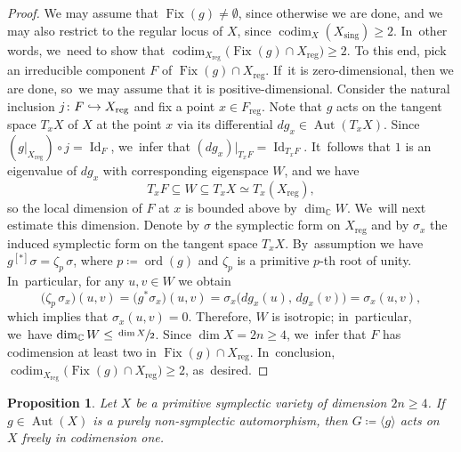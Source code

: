 \documentclass[JEP,XML,SOM,Unicode,published]{cedram}
\newcommand\hto{\mathrel{\lhook\joinrel\to}}
\theoremstyle{plain}
\newtheorem{prop}[thm]{Proposition}
\theoremstyle{definition}
\newcommand{\C}{\mathbb{C}}
\DeclareMathOperator{\codim}{codim}
\DeclareMathOperator{\Id}{Id}
\DeclareMathOperator{\Aut}{Aut}
\DeclareMathOperator{\Fix}{Fix}
\DeclareMathOperator{\ord}{ord}
\begin{document}
\begin{proof}
We may assume that $\Fix(g) \neq \emptyset$, since otherwise we are done, and we may also restrict to the regular locus of $X$, since $\codim_X (X_\text{sing}) \geq 2$. In~other words, we~need to show that $\codim_{X_\text{reg}} \bigl(\Fix(g) \cap X_{\text{reg}} \bigr) \geq 2$.
To this end, pick an irreducible component $F$ of $\Fix(g) \cap X_{\text{reg}}$. If~it is zero-dimensional, then we are done, so~we may assume that it is positive-dimensional. Consider the natural inclusion \hbox{$j \colon F \hto X_\text{reg}$} and fix a point $x \in F_\text{reg}$.
Note that $g$ acts on the tangent space $T_x X$ of $X$ at the point $x$ via its differential $dg_x \in \Aut(T_x X)$.
Since $(g |_{X_\text{reg}}) \circ j = \Id_{F}$, we~infer that $(dg_x) |_{T_x F} = \Id_{T_x F}$. It~follows that $1$ is an eigenvalue of $dg_x$ with corresponding eigenspace $W$, and we have
\[
T_x F \subseteq W \subseteq T_x X \simeq T_x (X_\text{reg}),
\]
so the local dimension of $F$ at $x$ is bounded above by $\dim_\C W$. We~will next estimate this dimension.
Denote by $\sigma$ the symplectic form on $X_{\text{reg}}$ and by $\sigma_x$ the induced symplectic form on the tangent space $T_x X$. By~assumption we have $g^{[*]} \sigma = \zeta_p \,\sigma$, where $p \coloneqq \ord(g)$ and $\zeta_p$ is a primitive $p$-th root of unity. In~particular, for any $u,v \in W$ we obtain
\[
\bigl(\zeta_p \,\sigma_x \bigr) (u,v) = \bigl(g^* \sigma_x \bigr) (u,v) = \sigma_x \bigl(dg_x(u), \,dg_x(v) \bigr) = \sigma_x(u,v),
\]
which implies that $\sigma_x(u,v)=0$. Therefore, $W$ is isotropic; in~particular, we~have
$ \dim_\C W \leq \sfrac{\dim X}{2} $. Since $\dim X = 2n \geq 4$, we~infer that $F$ has codimension at least two in $\Fix(g) \cap X_{\text{reg}}$. In~conclusion,
$ \codim_{X_\text{reg}} \bigl(\Fix(g) \cap X_{\text{reg}} \bigr) \geq 2 $, as~desired.
\end{proof}

\begin{prop}
\label{prop:group_acting_nonsymplectically_free_codim_one}
Let $X$ be a primitive symplectic variety of dimension $2n \geq 4$. If~$g \in \Aut(X)$ is a purely non-symplectic automorphism, then $G \coloneqq \langle g \rangle$ acts on~$X$ freely in codimension one.
\end{prop}
\end{document}
